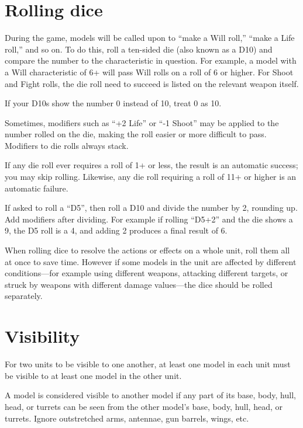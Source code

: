 \begin{multicols}{2}
\section*{Rolling dice}

During the game, models will be called upon to ``make a Will roll,'' ``make a Life roll,'' and so on. To do this, roll a ten-sided die (also known as a D10) and compare the number to the characteristic in question. For example, a model with a Will characteristic of 6+ will pass Will rolls on a roll of 6 or higher. For Shoot and Fight rolls, the die roll need to succeed is listed on the relevant weapon itself.

If your D10s show the number 0 instead of 10, treat 0 as 10.

Sometimes, modifiers such as ``+2 Life'' or ``-1 Shoot'' may be applied to the number rolled on the die, making the roll easier or more difficult to pass. Modifiers to die rolls always stack.

If any die roll ever requires a roll of 1+ or less, the result is an automatic success; you may skip rolling. Likewise, any die roll requiring a roll of 11+ or higher is an automatic failure.

If asked to roll a ``D5'', then roll a D10 and divide the number by 2, rounding up. Add modifiers after dividing. For example if rolling ``D5+2'' and the die shows a 9, the D5 roll is a 4, and adding 2 produces a final result of 6.

When rolling dice to resolve the actions or effects on a whole unit, roll them all at once to save time. However if some models in the unit are affected by different conditions—for example using different weapons, attacking different targets, or struck by weapons with different damage values—the dice should be rolled separately.




\section*{Visibility}

For two units to be visible to one another, at least one model in each unit must be visible to at least one model in the other unit.

A model is considered visible to another model if any part of its base, body, hull, head, or turrets can be seen from the other model's base, body, hull, head, or turrets. Ignore outstretched arms, antennae, gun barrels, wings, etc.


\end{multicols}
